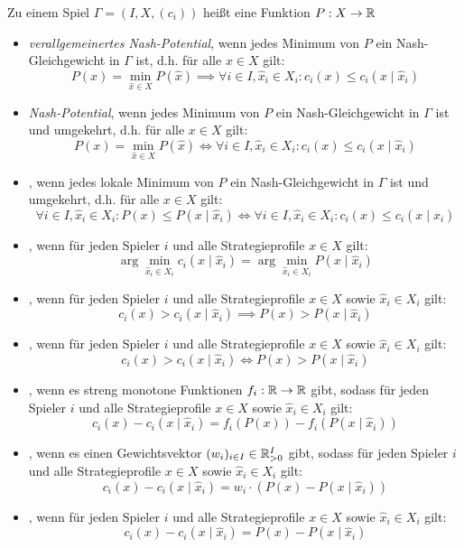 \begin{defn}
	Zu einem Spiel $\Gamma = (I, X, (c_i))$ heißt eine Funktion $P: X \to \mathbb{R}$
	\begin{itemize}
		\item \emph{verallgemeinertes Nash-Potential}, wenn jedes Minimum von $P$ ein Nash-Gleich\-ge\-wicht in $\Gamma$ ist, d.h. für alle $x \in X$ gilt:
			\[P(x) = \min_{\hat{x} \in X}P(\hat{x}) \implies \forall i \in I, \hat{x}_i \in X_i: c_i(x) \leq c_i(x \mid \hat{x}_i) \]
		\item \emph{Nash-Potential}, wenn jedes Minimum von $P$ ein Nash-Gleichgewicht in $\Gamma$ ist und umgekehrt, d.h. für alle $x \in X$ gilt:
			\[P(x) = \min_{\hat{x} \in X}P(\hat{x}) \iff \forall i \in I, \hat{x}_i \in X_i: c_i(x) \leq c_i(x \mid \hat{x}_i) \]
		\item {}, wenn jedes \glqq lokale\grqq{} Minimum von $P$ ein Nash-Gleichgewicht in $\Gamma$ ist und umgekehrt, d.h. für alle $x \in X$ gilt:
			\[\forall i \in I, \hat{x}_i \in X_i: P(x) \leq P(x \mid \hat{x}_i) \iff \forall i \in I, \hat{x}_i \in X_i: c_i(x) \leq c_i(x \mid \hat{x}_i) \]
		\item {}, wenn für jeden Spieler $i$ und alle Strategieprofile $x \in X$ gilt:
			\[\arg\min_{\hat{x}_i \in X_i}c_i(x \mid \hat{x}_i) = \arg \min_{\hat{x}_i \in X_i} P(x \mid \hat{x}_i)\]
		\item {}, wenn für jeden Spieler $i$ und alle Strategieprofile $x \in X$ sowie $\hat{x}_i \in X_i$ gilt:
			\[c_i(x) > c_i(x \mid \hat{x}_i) \implies P(x) > P(x \mid \hat{x}_i)\]
		\item {}, wenn für jeden Spieler $i$ und alle Strategieprofile $x \in X$ sowie $\hat{x}_i \in X_i$ gilt:
			\[c_i(x) > c_i(x \mid \hat{x}_i) \iff P(x) > P(x \mid \hat{x}_i)\]
		\item {}, wenn es streng monotone Funktionen $f_i: \mathbb{R} \to \mathbb{R}$ gibt, sodass für jeden Spieler $i$ und alle Strategieprofile $x \in X$ sowie $\hat{x}_i \in X_i$ gilt:
			\[c_i(x) - c_i(x \mid \hat{x}_i) = f_i(P(x)) - f_i(P(x \mid \hat{x}_i))\]
		\item {}, wenn es einen Gewichtsvektor $(w_i)_{i\in I} \in \mathbb{R}_{>0}^I$ gibt, sodass für jeden Spieler $i$ und alle Strategieprofile $x \in X$ sowie $\hat{x}_i \in X_i$ gilt:
			\[c_i(x) - c_i(x \mid \hat{x}_i) = w_i\cdot(P(x) - P(x \mid \hat{x}_i))\]
		\item {}, wenn für jeden Spieler $i$ und alle Strategieprofile $x \in X$ sowie $\hat{x}_i \in X_i$ gilt:
			\[c_i(x) - c_i(x \mid \hat{x}_i) = P(x) - P(x \mid \hat{x}_i)\]
	\end{itemize}
\end{defn}

